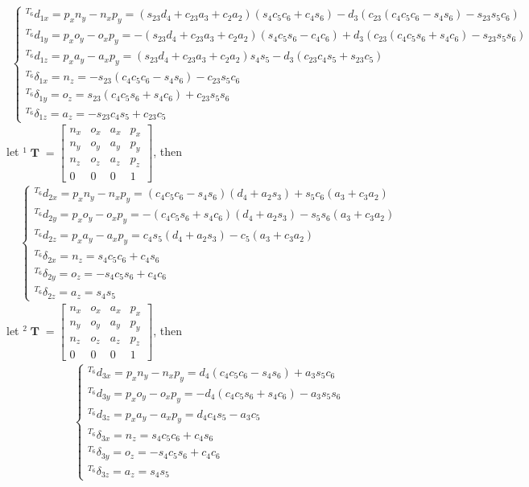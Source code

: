 \documentclass[12pt]{article}
\DeclareMathOperator{\T}{\mathbf{T}}
\begin{document}
  \begin{align*}
    \begin{cases}
      ^{T_6}d_{1x} = p_xn_y-n_xp_y = (s_{23}d_4+c_{23}a_3+c_2a_2)(s_4c_5c_6+c_4s_6)-d_3(c_{23}(c_4c_5c_6-s_4s_6)-s_{23}s_5c_6)\\
      ^{T_6}d_{1y} = p_xo_y-o_xp_y = -(s_{23}d_4+c_{23}a_3+c_2a_2)(s_4c_5s_6-c_4c_6)+d_3(c_{23}(c_4c_5s_6+s_4c_6)-s_{23}s_5s_6)\\
      ^{T_6}d_{1z} = p_xa_y-a_xp_y = (s_{23}d_4+c_{23}a_3+c_2a_2)s_4s_5-d_3(c_{23}c_4s_5+s_{23}c_5)\\
      ^{T_6}\delta_{1x} = n_z = -s_{23}(c_4c_5c_6-s_4s_6)-c_{23}s_5c_6\\
      ^{T_6}\delta_{1y} = o_z = s_{23}(c_4c_5s_6+s_4c_6)+c_{23}s_5s_6\\
      ^{T_6}\delta_{1z} = a_z = -s_{23}c_4s_5+c_{23}c_5
    \end{cases}
  \end{align*}
  let
  $^1\T = \begin{bmatrix}
    n_x & o_x & a_x & p_x\\
    n_y & o_y & a_y & p_y\\
    n_z & o_z & a_z & p_z\\
    0 & 0 & 0 & 1
  \end{bmatrix}$, then
  \begin{align*}
    \begin{cases}
      ^{T_6}d_{2x} = p_xn_y-n_xp_y = (c_4c_5c_6-s_4s_6)(d_4+a_2s_3)+s_5c_6(a_3+c_3a_2)\\
      ^{T_6}d_{2y} = p_xo_y-o_xp_y = -(c_4c_5s_6+s_4c_6)(d_4+a_2s_3)-s_5s_6(a_3+c_3a_2)\\
      ^{T_6}d_{2z} = p_xa_y-a_xp_y = c_4s_5(d_4+a_2s_3)-c_5(a_3+c_3a_2)\\
      ^{T_6}\delta_{2x} = n_z = s_4c_5c_6+c_4s_6\\
      ^{T_6}\delta_{2y} = o_z = -s_4c_5s_6+c_4c_6\\
      ^{T_6}\delta_{2z} = a_z = s_4s_5
    \end{cases}
  \end{align*}
  let
  $^2\T = \begin{bmatrix}
    n_x & o_x & a_x & p_x\\
    n_y & o_y & a_y & p_y\\
    n_z & o_z & a_z & p_z\\
    0 & 0 & 0 & 1
  \end{bmatrix}$, then
  \begin{align*}
    \begin{cases}
      ^{T_6}d_{3x} = p_xn_y-n_xp_y = d_4(c_4c_5c_6-s_4s_6)+a_3s_5c_6\\
      ^{T_6}d_{3y} = p_xo_y-o_xp_y = -d_4(c_4c_5s_6+s_4c_6)-a_3s_5s_6\\
      ^{T_6}d_{3z} = p_xa_y-a_xp_y = d_4c_4s_5-a_3c_5\\
      ^{T_6}\delta_{3x} = n_z = s_4c_5c_6+c_4s_6\\
      ^{T_6}\delta_{3y} = o_z = -s_4c_5s_6+c_4c_6\\
      ^{T_6}\delta_{3z} = a_z = s_4s_5
    \end{cases}
  \end{align*}
\end{document}
